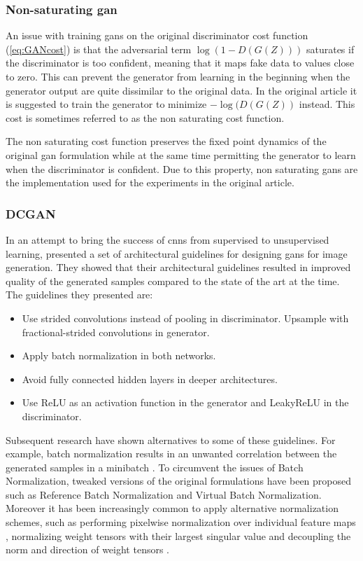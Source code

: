 \subsubsection{Non-saturating \acrshort{gan}} 
An issue with training \acrshort{gans} on the original discriminator cost function (\ref{eq:GANcost}) is that the adversarial term $\log(1-D(G(Z)))$ saturates if the discriminator is too confident, meaning that it maps fake data to values close to zero. This can prevent the generator from learning in the beginning when the generator output are quite dissimilar to the original data. In the original article it is suggested to train the generator to minimize $-\log(D(G(Z))$ instead. This cost is sometimes referred to as the non saturating cost function.

The non saturating cost function preserves the fixed point dynamics of the original \acrshort{gan} formulation while at the same time permitting the generator to learn when the discriminator is confident. Due to this property, non saturating \acrshort{gans} are the implementation used for the experiments in the original article.

\subsubsection{DCGAN}
In an attempt to bring the success of \acrfull{cnns} from supervised to unsupervised learning, \textcite{radfordMC152015} presented a set of architectural guidelines for designing \acrshort{gans} for image generation. They showed that their architectural guidelines resulted in improved quality of the generated samples compared to the state of the art at the time. The guidelines they presented are:

\begin{itemize}
    \item Use strided convolutions instead of pooling in discriminator. Upsample with fractional-strided convolutions in generator.
    \item Apply batch normalization \parencite{ioffeS15batchnorm} in both networks.
    \item Avoid fully connected hidden layers in deeper architectures.
    \item Use ReLU as an activation function in the generator and LeakyReLU \parencite{maas2013rectifier} in the discriminator.
\end{itemize}

Subsequent research have shown alternatives to some of these guidelines. For example, batch normalization results in an unwanted correlation between the generated samples in a minibatch \parencite{salimans2016improved}. To circumvent the issues of Batch Normalization, tweaked versions of the original formulations have been proposed such as Reference Batch Normalization and Virtual Batch Normalization. Moreover it has been increasingly common to apply alternative normalization schemes, such as performing pixelwise normalization over individual feature maps \parencite{karras2017progressive}, normalizing weight tensors with their largest singular value \parencite{miyato2017spectral} and decoupling the norm and direction of weight tensors \parencite{NIPS2016weightnorm, xiang2017effects}.

